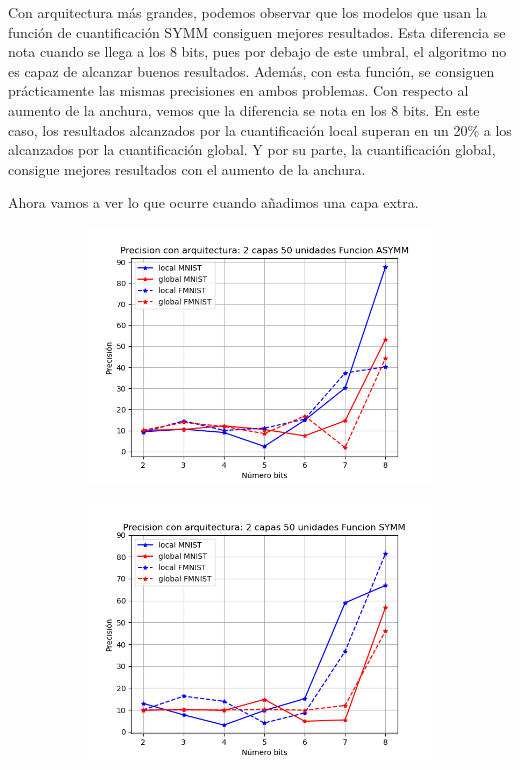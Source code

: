 Con arquitectura más grandes, podemos observar que los modelos que usan la función de cuantificación SYMM consiguen mejores resultados. Esta diferencia se nota cuando se llega a los 8 bits, pues por debajo de este umbral, el algoritmo no es capaz de alcanzar buenos resultados. Además, con esta función, se consiguen prácticamente las mismas precisiones en ambos problemas. Con respecto al aumento de la anchura, vemos que la diferencia se nota en los 8 bits. En este caso, los resultados alcanzados por la cuantificación local superan en un 20\% a los alcanzados por la cuantificación global. Y por su parte, la cuantificación global, consigue mejores resultados con el aumento de la anchura.

\newpage
Ahora vamos a ver lo que ocurre cuando añadimos una capa extra.

\begin{figure}[H]
    \centering
    \begin{subfigure}[H]{0.475\textwidth}
    \includegraphics[width=\textwidth]{imagenes/HSIC/Precision con arquitectura: 2 capas 50 unidades Funcion ASYMM.png}
    \end{subfigure}
    \begin{subfigure}[H]{0.475\textwidth}
    \includegraphics[width=\textwidth]{imagenes/HSIC/Precision con arquitectura: 2 capas 50 unidades Funcion SYMM.png}

\end{subfigure}
\end{figure}
